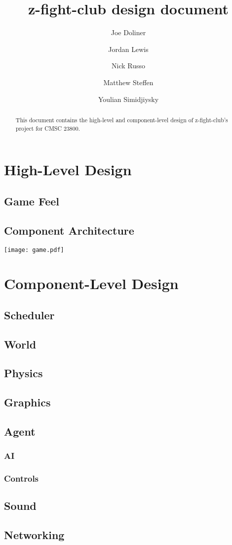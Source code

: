 \documentclass[12pt]{article}
\title{z-fight-club design document}
\author{Joe Doliner \and Jordan Lewis \and Nick Russo \and Matthew Steffen \and Youlian Simidjiysky}
\begin{document}
\maketitle
\begin{abstract}
This document contains the high-level and component-level design of
z-fight-club's project for CMSC 23800.
\end{abstract}
\section{High-Level Design}
\subsection{Game Feel}
\subsection{Component Architecture}
\texttt{[image: game.pdf]}

\section{Component-Level Design}
\subsection{Scheduler}
\subsection{World}
\subsection{Physics}
\subsection{Graphics}
\subsection{Agent}
\subsubsection{AI}
\subsubsection{Controls}
\subsection{Sound}
\subsection{Networking}
\end{document}
